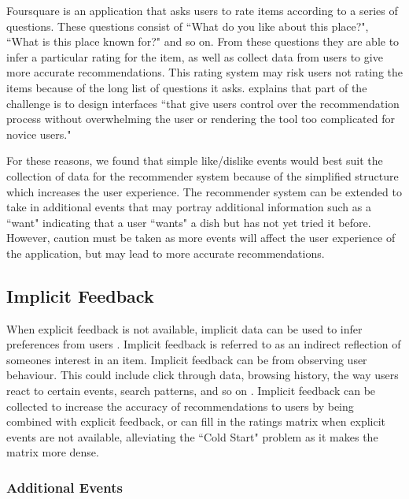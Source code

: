 Foursquare \cite{foursquare} is an application that asks users to rate items according to a series of questions. These questions consist of ``What do you like about this place?", ``What is this place known for?" and so on. From these questions they are able to infer a particular rating for the item, as well as collect data from users to give more accurate recommendations. This rating system may risk users not rating the items because of the long list of questions it asks. \cite{martin2009recsys} explains that part of the challenge is to design interfaces ``that give users control over the recommendation process without overwhelming the user or rendering the tool too complicated for novice users." 

For these reasons, we found that simple like/dislike events would best suit the collection of data for the recommender system because of the simplified structure which increases the user experience. The recommender system can be extended to take in additional events that may portray additional information such as a ``want" indicating that a user ``wants" a dish but has not yet tried it before. However, caution must be taken as more events will affect the user experience of the application, but may lead to more accurate recommendations. 

\subsection{Implicit Feedback}

When explicit feedback is not available, implicit data can be used to infer preferences from users \cite{koren2009matrix}. Implicit feedback is referred to as an indirect reflection of someones interest in an item. Implicit feedback can be from observing user behaviour. This could include click through data, browsing history, the way users react to certain events, search patterns, and so on \cite{koren2009matrix}. Implicit feedback can be collected to increase the accuracy of recommendations to users by being combined with explicit feedback, or can fill in the ratings matrix when explicit events are not available, alleviating the ``Cold Start" problem as it makes the matrix more dense. 

\subsubsection{Additional Events}

